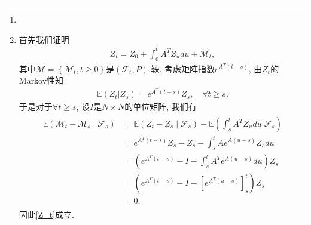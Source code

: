 \documentclass[12pt]{article}
\makeatletter
\renewenvironment{proof}[1][\proofname]{\par
  \pushQED{\qed}%
  \normalfont \topsep6\p@\@plus6\p@\relax
  \trivlist
  \item[\hskip\labelsep
        \bfseries\itshape
    #1\@addpunct{.}]\ignorespaces
}{%
  \popQED\endtrivlist\@endpefalse
}
\makeatother
\begin{document}
\hrule height 1pt
\vspace{0.8cm}
\begin{enumerate}
  \item \begin{proof}
首先我们证明
\begin{eqnarray}
  Z_t = Z_0 + \int_0^t A^T Z_udu + \mathcal{M}_t, \label{Z_t}
\end{eqnarray}
其中$\mathcal{M} = \left\{\mathcal{M}_t , t\ge 0\right\}$是$(\mathcal{F}_t,P)$-鞅. 
考虑矩阵指数$e^{A^T(t-s)}$, 由$Z_t$的Markov性知
\begin{eqnarray}
  \mathbb{E}(Z_t|Z_s) = e^{A^T(t-s)}Z_s, \quad \forall t\ge s.
\end{eqnarray}
于是对于$\forall t\ge s$, 设$I$是$N\times N$的单位矩阵, 我们有
\begin{eqnarray}
  \begin{aligned}
    \mathbb{E}\left(\mathcal{M}_t-\mathcal{M}_s \mid \mathcal{F}_s\right) & = \mathbb{E}\left(Z_t-Z_s \mid \mathcal{F}_s\right)- \mathbb{E}\left(\int_s^t A^T Z_u d u \big| \mathcal{F}_s\right) \\
    & =e^{A^T(t-s)} Z_s-Z_s-\int_s^t A e^{A(u-s)} Z_s d u \\
    & =\left(e^{A^T(t-s)}-I-\int_s^t A^T e^{A(u-s)} d u\right) Z_s \\
    & =\left(e^{A^T(t-s)}-I-\left[e^{A^T(u-s)}\right]_s^t\right) Z_s \\ 
    & =0,
    \end{aligned}
\end{eqnarray}
因此\eqref{Z_t}成立. 


\end{proof}
\end{enumerate}
\end{document}
